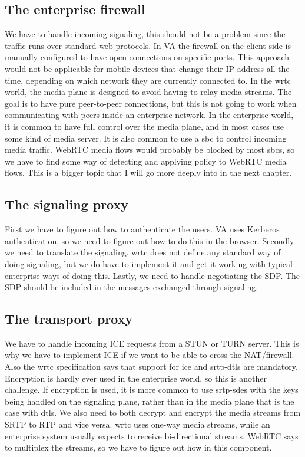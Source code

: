 \subsection{The enterprise firewall}
We have to handle incoming signaling, this should not be a problem since the traffic runs over standard web protocols. In VA the firewall on the client side is manually configured to have open connections on specific ports. This approach would not be applicable for mobile devices that change their IP address all the time, depending on which network they are currently connected to. In the \gls{wrtc} world, the media plane is designed to avoid having to relay media streams. The goal is to have pure peer-to-peer connections, but this is not going to work when communicating with peers inside an enterprise network. In the enterprise world, it is common to have full control over the media plane, and in most cases use some kind of media server. It is also common to use a \gls{sbc} to control incoming media traffic. WebRTC media flows would probably be blocked by most \gls{sbc}s, so we have to find some way of detecting and applying policy to WebRTC media flows. This is a bigger topic that I will go more deeply into in the next chapter.

\subsection{The signaling proxy}
First we have to figure out how to authenticate the users. VA uses Kerberos authentication, so we need to figure out how to do this in the browser. Secondly we need to translate the signaling. \gls{wrtc} does not define any standard way of doing signaling, but we do have to implement it and get it working with typical enterprise ways of doing this. Lastly, we need to handle negotiating the SDP. The SDP should be included in the messages exchanged through signaling.
 

\subsection{The transport proxy}
We have to handle incoming ICE requests from a STUN or TURN server. This is why we have to implement ICE if we want to be able to cross the NAT/firewall. Also the \gls{wrtc} specification says that support for \gls{ice} and \gls{srtp}-\gls{dtls} are mandatory. Encryption is hardly ever used in the enterprise world, so this is another challenge. If encryption is used, it is more common to use \gls{srtp}-\gls{sdes} with the keys being handled on the signaling plane, rather than in the media plane that is the case with \gls{dtls}. We also need to both decrypt and encrypt the media streams from SRTP to RTP and vice versa. \gls{wrtc} uses one-way media streams, while an enterprise system usually expects to receive bi-directional streams. WebRTC says to multiplex the streams, so we have to figure out how in this component.

